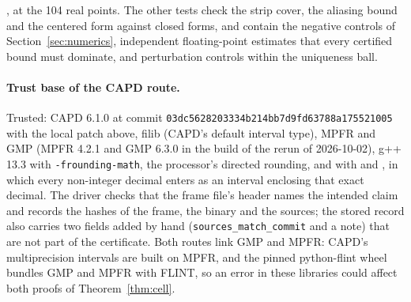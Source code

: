 \documentclass[11pt]{article}
\theoremstyle{definition}
\begin{document}
, at the 104 real points. The other tests check the strip cover, the aliasing bound and the centered form against closed forms, and contain the negative controls of Section~\ref{sec:numerics}, independent floating-point estimates that every certified bound must dominate, and perturbation controls within the uniqueness ball.

\paragraph{Trust base of the CAPD route.} Trusted: CAPD 6.1.0 at commit \texttt{03dc5628203334b214bb7\allowbreak d9fd63788a175521005} with the local patch above, filib (CAPD's default interval type), MPFR and GMP (MPFR 4.2.1 and GMP 6.3.0 in the build of the rerun of 2026-10-02), g++ 13.3 with \texttt{-frounding-math}, the processor's directed rounding, and  with  and , in which every non-integer decimal enters as an interval enclosing that exact decimal. The driver  checks that the frame file's header names the intended claim and records the hashes of the frame, the binary and the sources; the stored record also carries two fields added by hand (\texttt{sources\_match\_commit} and a note) that are not part of the certificate. Both routes link GMP and MPFR: CAPD's multiprecision intervals are built on MPFR, and the pinned python-flint wheel bundles GMP and MPFR with FLINT, so an error in these libraries could affect both proofs of Theorem~\ref{thm:cell}.
\end{document}
